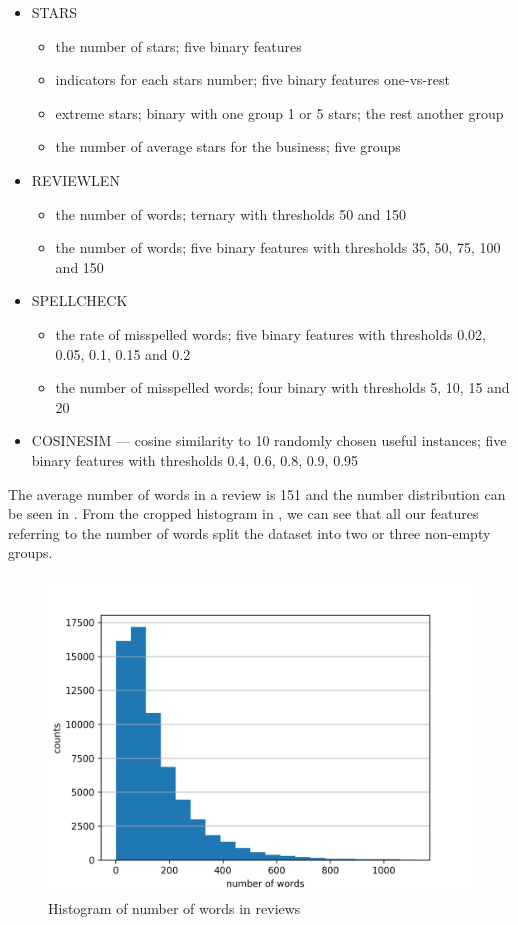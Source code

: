 \begin{itemize}
	\item STARS 
		\begin{itemize}
			\item the number of stars; five binary features
			\item indicators for each stars number; five binary features one-vs-rest
			\item extreme stars; binary with one group 1 or 5 stars; the rest another group
			\item the number of average stars for the business; five groups
		\end{itemize}
	\item REVIEWLEN 
		\begin{itemize}
			\item the number of words; ternary with thresholds 50 and 150
			\item the number of words; five binary features with thresholds 35, 50, 75, 100 and 150
		\end{itemize}
	\item SPELLCHECK 
		\begin{itemize}
			\item the rate of misspelled words; five binary features with thresholds 0.02, 0.05, 0.1, 0.15 and 0.2
			\item the number of misspelled words; four binary with thresholds 5, 10, 15 and 20
		\end{itemize}
	
	\item COSINESIM --- cosine similarity to 10 randomly chosen useful instances; five binary features with thresholds 0.4, 0.6, 0.8, 0.9, 0.95
\end{itemize}

The average number of words in a review is 151 and the number distribution can be seen
in .
From the cropped histogram in , we can see that all our features
referring to the number of words split the dataset into two or three non-empty groups.

\begin{figure}[ht]\centering
\includegraphics[width=130mm]{figures/word_hist.png}
\caption{Histogram of number of words in reviews}\label{fig:word_hist}
\end{figure}

